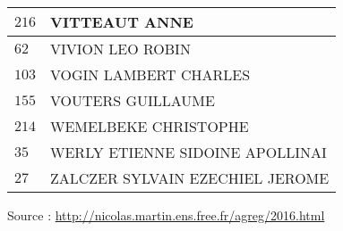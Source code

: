 \begin{xltabular}{\linewidth}{|l|X|}
    \hline
    $216$ & VITTEAUT ANNE \\
    \hline
    $62$ & VIVION LEO ROBIN \\
    \hline
    $103$ & VOGIN LAMBERT CHARLES \\
    \hline
    $155$ & VOUTERS GUILLAUME \\
    \hline
    $214$ & WEMELBEKE CHRISTOPHE \\
    \hline
    $35$ & WERLY ETIENNE SIDOINE APOLLINAI \\
    \hline
    $27$ & ZALCZER SYLVAIN EZECHIEL JEROME \\
    \hline
  \end{xltabular}

  \begin{flushright}
    {\tiny Source : \url{http://nicolas.martin.ens.free.fr/agreg/2016.html}}
  \end{flushright}

